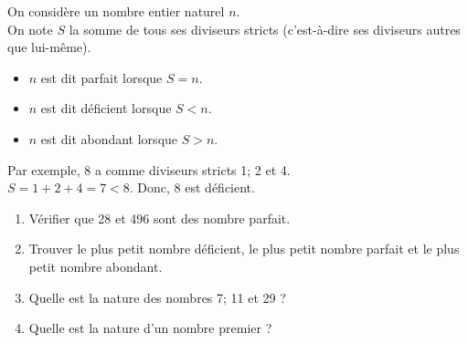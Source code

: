 \begin{colonne*exercice}
\begin{exercice} %
   On considère un nombre entier naturel $n$. \\
   On note $S$ la somme de tous ses diviseurs stricts (c'est-à-dire ses diviseurs autres que lui-même). 
   \begin{itemize}
      \item $n$ est dit parfait lorsque $S=n$.
      \item $n$ est dit déficient lorsque $S<n$.
      \item $n$ est dit abondant lorsque $S>n$.
   \end{itemize}
   Par exemple, 8 a comme diviseurs stricts 1; 2 et 4. \\
   $S =1+2+4 =7< 8$. Donc, 8 est déficient.
   \begin{enumerate}
      \item Vérifier que 28 et 496 sont des nombre parfait.
      \item Trouver le plus petit nombre déficient, le plus petit nombre parfait et le plus petit nombre abondant.
      \item Quelle est la nature des nombres 7; 11 et 29 ?
      \item Quelle est la nature d'un nombre premier ?
   \end{enumerate}
\end{exercice}


\end{colonne*exercice}
